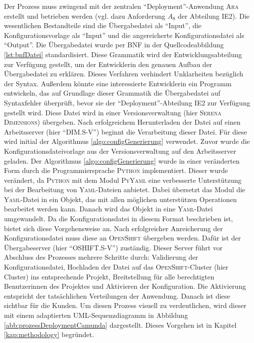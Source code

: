 Der Prozess muss zwingend mit der zentralen \enquote{Deployment}-Anwendung \textsc{Ara} erstellt und betrieben werden (vgl. dazu Anforderung $A_{8}$ der Abteilung \ac{IE2}). Die wesentlichen Bestandteile sind die Übergabedatei als \enquote{Input}, die Konfigurationsvorlage als \enquote{Input} und die angereicherte Konfigurationsdatei als \enquote{Output}. Die Übergabedatei wurde per \ac{BNF} in der Quellcodeabbildung \vref{lst:bnfDatei} standardisiert. Diese Grammatik wird der Entwicklungsabteilung zur Verfügung gestellt, um der Entwicklerin den genauen Aufbau der Übergabedatei zu erklären. Dieses Verfahren verhindert Unklarheiten bezüglich der Syntax. Außerdem könnte eine interessierte Entwicklerin ein Programm entwickeln, das auf Grundlage dieser Grammatik die Übergabedatei auf Syntaxfehler überprüft, bevor sie der \enquote{Deployment}-Abteilung \ac{IE2} zur Verfügung gestellt wird. Diese Datei wird in einer Versionsverwaltung (hier \textsc{Serena Dimensions}) übergeben. Nach erfolgreichem Herunterladen der Datei auf einen Arbeitsserver (hier \enquote{DIM.S-V}) beginnt die Verarbeitung dieser Datei. Für diese wird initial der Algorithmus \vref{algo:configGenerierung} verwendet. Zuvor wurde die Konfigurationsdateivorlage aus der Versionsverwaltung auf den Arbeitsserver geladen. Der Algorithmus \vref{algo:configGenerierung} wurde in einer veränderten Form durch die Programmiersprache \textsc{Python} implementiert. Dieser wurde verändert, da \textsc{Python} mit dem Modul \textsc{PyYaml} eine verbesserte Unterstützung bei der Bearbeitung von \textsc{Yaml}-Dateien anbietet. Dabei übersetzt das Modul die \textsc{Yaml}-Datei in ein Objekt, das mit allen möglichen unterstützen Operationen bearbeitet werden kann. Danach wird das Objekt in eine \textsc{Yaml}-Datei umgewandelt. Da die Konfigurationsdatei in diesem Format beschrieben ist, bietet sich diese Vorgehensweise an. Nach erfolgreicher Anreicherung der Konfigurationsdatei muss diese an \textsc{OpenShift} übergeben werden. Dafür ist der Übergabeserver (hier \enquote{OSHIFT.S-V}) zuständig. Dieser Server führt vor Abschluss des Prozesses mehrere Schritte durch: Validierung der Konfigurationsdatei, Hochladen der Datei auf das \textsc{OpenShift}-Cluster (hier Cluster) ins entsprechende Projekt, Breitstellung für alle berechtigten Benutzerinnen des Projektes und Aktivieren der Konfiguration. Die Aktivierung entspricht der tatsächlichen Verteilungen der Anwendung. Danach ist diese sichtbar für die Kunden. Um diesen Prozess visuell zu verdeutlichen, wird dieser mit einem adaptierten \ac{UML}-Sequenzdiagramm in Abbildung \vref{abb:prozessDeploymentCamunda} dargestellt. Dieses Vorgehen ist in Kapitel \vref{kap:methodology} begründet.

